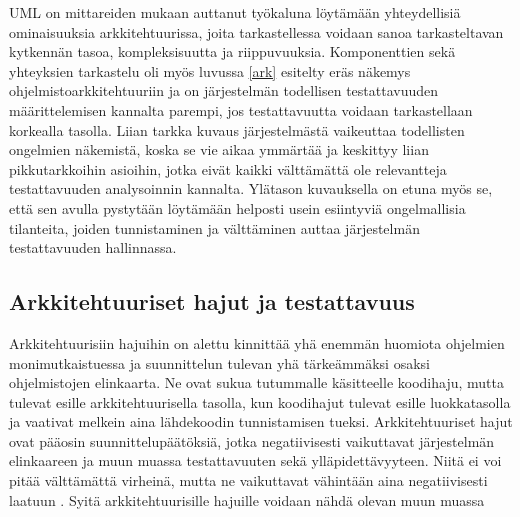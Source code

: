 \documentclass[finnish]{tktltiki2}
\numberwithin{table}{section}
\theoremstyle{definition}
\theoremstyle{remark}
\begin{document}
UML on mittareiden mukaan auttanut työkaluna löytämään yhteydellisiä ominaisuuksia arkkitehtuurissa, joita tarkastellessa voidaan sanoa tarkasteltavan  kytkennän tasoa, kompleksisuutta ja riippuvuuksia. Komponenttien sekä yhteyksien tarkastelu oli myös luvussa \ref{ark} esitelty eräs näkemys ohjelmistoarkkitehtuuriin ja on järjestelmän todellisen testattavuuden määrittelemisen kannalta parempi, jos testattavuutta voidaan tarkastellaan korkealla tasolla. Liian tarkka kuvaus järjestelmästä vaikeuttaa todellisten ongelmien näkemistä, koska se vie aikaa ymmärtää ja keskittyy liian pikkutarkkoihin asioihin, jotka eivät kaikki välttämättä ole relevantteja testattavuuden analysoinnin kannalta. Ylätason kuvauksella on etuna myös se, että sen avulla pystytään löytämään helposti usein esiintyviä ongelmallisia tilanteita, joiden tunnistaminen ja välttäminen auttaa järjestelmän testattavuuden hallinnassa.

 

\subsection{Arkkitehtuuriset hajut ja testattavuus} \label{arch_smells_and_testability}

Arkkitehtuurisiin hajuihin on alettu kinnittää yhä enemmän huomiota ohjelmien monimutkaistuessa ja suunnittelun tulevan yhä tärkeämmäksi osaksi ohjelmistojen elinkaarta. Ne ovat sukua tutummalle käsitteelle koodihaju, mutta tulevat esille arkkitehtuurisella tasolla, kun koodihajut tulevat esille luokkatasolla ja vaativat melkein aina lähdekoodin tunnistamisen tueksi. Arkkitehtuuriset hajut ovat pääosin suunnittelupäätöksiä, jotka negatiivisesti vaikuttavat järjestelmän elinkaareen ja muun muassa testattavuuten sekä ylläpidettävyyteen. Niitä ei voi pitää välttämättä virheinä, mutta ne vaikuttavat vähintään aina negatiivisesti laatuun \citep{de_andrade_architectural_2014}. Syitä arkkitehtuurisille hajuille voidaan nähdä olevan muun muassa 
\end{document}
